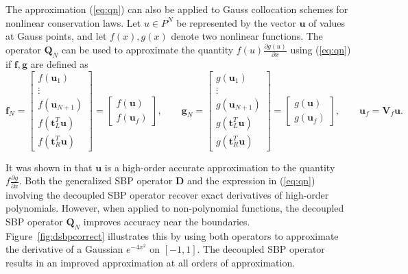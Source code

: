 \documentclass[review,onefignum,onetabnum,final]{siamart171218}
\newcommand{\pd}[2]{\frac{\partial#1}{\partial#2}}
\newcommand{\LRp}[1]{\left( #1 \right)}
\begin{document}
The approximation (\ref{eq:qn}) can also be applied to Gauss collocation schemes for nonlinear conservation laws. Let $u \in P^N$ be represented by the vector $\bm{u}$ of values at Gauss points, and let $f(x), g(x)$ denote two nonlinear functions.   The operator $\bm{Q}_N$ can be used to approximate the quantity $f(u)\pd{g(u)}{x}$ using (\ref{eq:qn}) if $\bm{f}, \bm{g}$ are defined as
\[
\bm{f}_N = \begin{bmatrix}
f\LRp{\bm{u}_1}\\
\vdots\\
f\LRp{\bm{u}_{N+1}}\\
f\LRp{\bm{t}_L^T\bm{u}}\\
f\LRp{\bm{t}_R^T\bm{u}}
\end{bmatrix} = \begin{bmatrix}
f(\bm{u}) \\
f(\bm{u}_f)
\end{bmatrix}, \qquad
\bm{g}_N = \begin{bmatrix}
g\LRp{\bm{u}_1}\\
\vdots\\
g\LRp{\bm{u}_{N+1}}\\
g\LRp{\bm{t}_L^T\bm{u}}\\
g\LRp{\bm{t}_R^T\bm{u}}
\end{bmatrix} = \begin{bmatrix}
g(\bm{u}) \\
g(\bm{u}_f)
\end{bmatrix}, \qquad \bm{u}_f = \bm{V}_f\bm{u}.
\]

It was shown in \cite{chan2017discretely} that $\bm{u}$ is a high-order accurate approximation to the quantity $f\pd{g}{x}$.  Both the generalized SBP operator $\bm{D}$ and the expression in (\ref{eq:qn}) involving the decoupled SBP operator recover exact derivatives of high-order polynomials.  However, when applied to non-polynomial functions, the decoupled SBP operator $\bm{Q}_N$ improves accuracy near the boundaries.  Figure~\ref{fig:dsbpcorrect} illustrates this by using both operators to approximate the derivative of a Gaussian $e^{-4x^2}$ on $[-1,1]$.  The decoupled SBP operator results in an improved approximation at all orders of approximation.  %
\end{document}
